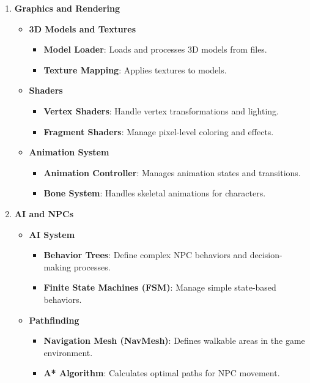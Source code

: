 \begin{enumerate}
	\item \textbf{Graphics and Rendering}
	\begin{itemize}
		\item \textbf{3D Models and Textures}
		\begin{itemize}
			\item \textbf{Model Loader}: Loads and processes 3D models from files.
			\item \textbf{Texture Mapping}: Applies textures to models.
		\end{itemize}
		\item \textbf{Shaders}
		\begin{itemize}
			\item \textbf{Vertex Shaders}: Handle vertex transformations and lighting.
			\item \textbf{Fragment Shaders}: Manage pixel-level coloring and effects.
		\end{itemize}
		\item \textbf{Animation System}
		\begin{itemize}
			\item \textbf{Animation Controller}: Manages animation states and transitions.
			\item \textbf{Bone System}: Handles skeletal animations for characters.
		\end{itemize}
	\end{itemize}
	
	\item \textbf{AI and NPCs}
	\begin{itemize}
		\item \textbf{AI System}
		\begin{itemize}
			\item \textbf{Behavior Trees}: Define complex NPC behaviors and decision-making processes.
			\item \textbf{Finite State Machines (FSM)}: Manage simple state-based behaviors.
		\end{itemize}
		\item \textbf{Pathfinding}
		\begin{itemize}
			\item \textbf{Navigation Mesh (NavMesh)}: Defines walkable areas in the game environment.
			\item \textbf{A* Algorithm}: Calculates optimal paths for NPC movement.
		\end{itemize}
	\end{itemize}
	

\end{enumerate}

